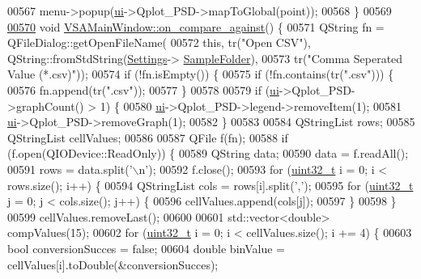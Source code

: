 \begin{DoxyCode}
{00567   menu->popup(\hyperlink{class_v_s_a_main_window_a958a0581d2bf1bfe020c3b5d8f738640}{ui}->Qplot\_PSD->mapToGlobal(point));
00568 \}
00569 
\hypertarget{vsamainwindow_8cpp_source_l00570}{}\hyperlink{class_v_s_a_main_window_a26fbb5e4ad62a0aeef99b8ae23c0e85e}{00570} \textcolor{keywordtype}{void} \hyperlink{class_v_s_a_main_window_a26fbb5e4ad62a0aeef99b8ae23c0e85e}{VSAMainWindow::on\_compare\_against}() \{
00571   QString fn = QFileDialog::getOpenFileName(
00572       \textcolor{keyword}{this}, tr(\textcolor{stringliteral}{"Open CSV"}), QString::fromStdString(\hyperlink{class_v_s_a_main_window_a429310b9a60f66c4283dc609f869b48d}{Settings}->
      \hyperlink{class_soil_analyzer_1_1_soil_settings_adfd46a349d927988c955fa064fc7bf1a}{SampleFolder}),
00573       tr(\textcolor{stringliteral}{"Comma Seperated Value (*.csv)"}));
00574   \textcolor{keywordflow}{if} (!fn.isEmpty()) \{
00575     \textcolor{keywordflow}{if} (!fn.contains(tr(\textcolor{stringliteral}{".csv"}))) \{
00576       fn.append(tr(\textcolor{stringliteral}{".csv"}));
00577     \}
00578 
00579     \textcolor{keywordflow}{if} (\hyperlink{class_v_s_a_main_window_a958a0581d2bf1bfe020c3b5d8f738640}{ui}->Qplot\_PSD->graphCount() > 1) \{
00580       \hyperlink{class_v_s_a_main_window_a958a0581d2bf1bfe020c3b5d8f738640}{ui}->Qplot\_PSD->legend->removeItem(1);
00581       \hyperlink{class_v_s_a_main_window_a958a0581d2bf1bfe020c3b5d8f738640}{ui}->Qplot\_PSD->removeGraph(1);
00582     \}
00583 
00584     QStringList rows;
00585     QStringList cellValues;
00586 
00587     QFile f(fn);
00588     \textcolor{keywordflow}{if} (f.open(QIODevice::ReadOnly)) \{
00589       QString data;
00590       data = f.readAll();
00591       rows = data.split(\textcolor{charliteral}{'\(\backslash\)n'});
00592       f.close();
00593       \textcolor{keywordflow}{for} (\hyperlink{_soil_math_types_8h_a435d1572bf3f880d55459d9805097f62}{uint32\_t} i = 0; i < rows.size(); i++) \{
00594         QStringList cols = rows[i].split(\textcolor{charliteral}{','});
00595         \textcolor{keywordflow}{for} (\hyperlink{_soil_math_types_8h_a435d1572bf3f880d55459d9805097f62}{uint32\_t} j = 0; j < cols.size(); j++) \{
00596           cellValues.append(cols[j]);
00597         \}
00598       \}
00599       cellValues.removeLast();
00600 
00601       std::vector<double> compValues(15);
00602       \textcolor{keywordflow}{for} (\hyperlink{_soil_math_types_8h_a435d1572bf3f880d55459d9805097f62}{uint32\_t} i = 0; i < cellValues.size(); i += 4) \{
00603         \textcolor{keywordtype}{bool} conversionSucces = \textcolor{keyword}{false};
00604         \textcolor{keywordtype}{double} binValue = cellValues[i].toDouble(&conversionSucces);
}
\end{DoxyCode}
